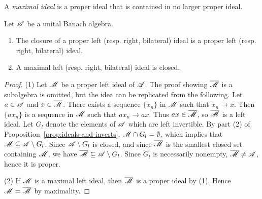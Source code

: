 \documentclass[reqno]{amsart}
\begin{document}
\begin{definition}
	A \emph{maximal ideal} is a proper ideal that is contained in no larger proper ideal.
\end{definition}

\begin{corollary}
	Let $\mathscr{A}$ be a unital Banach algebra.
	\mbox{}
	\begin{enumerate}[label = (\arabic*),itemsep=1pt,topsep=3pt]
		\item The closure of a proper left (resp. right, bilateral) ideal is a proper left (resp. right, bilateral) ideal.
		\item A maximal left (resp. right, bilateral) ideal is closed.
	\end{enumerate}
\end{corollary}
	\begin{proof}
		(1) Let $\mathscr{M}$ be a proper left ideal of $\mathscr{A}$. The proof showing $\overline{\mathscr{M}}$ is a subalgebra is omitted, but the idea can be replicated from the following. Let $a \in \mathscr{A}$ and $x \in \overline{\mathscr{M}}$. There exists a sequence $\{x_n\}$ in $\mathscr{M}$ such that $x_n \rightarrow x$. Then $\{a x_n\}$ is a sequence in $\mathscr{M}$ such that $a x_n \rightarrow ax$. Thus $ax \in \overline{\mathscr{M}}$, so $\overline{\mathscr{M}}$ is a left ideal. Let $G_l$ denote the elements of $\mathscr{A}$ which are left invertible. By part (2) of Proposition~\ref{prop:ideals-and-inverts}, $\mathscr{M} \cap G_l = \emptyset$, which implies that $\mathscr{M} \subseteq \mathscr{A} \setminus G_l$. Since $\mathscr{A} \setminus G_l$ is closed, and since $\overline{\mathscr{M}}$ is the smallest closed set containing $\mathscr{M}$, we have $\overline{\mathscr{M}} \subseteq \mathscr{A} \setminus G_l$. Since $G_l$ is necessarily nonempty, $\overline{\mathscr{M}} \neq \mathscr{A}$, hence it is proper.

		(2) If $\mathscr{M}$ is a maximal left ideal, then $\overline{\mathscr{M}}$ is a proper ideal by (1). Hence $\mathscr{M} = \overline{\mathscr{M}}$ by maximality.
	\end{proof}
\end{document}
